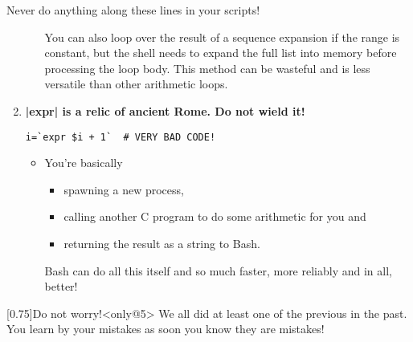 \begin{frame}[fragile]{Never do anything along these lines in your scripts!}
\begin{enumerate}
\begin{itemize}
                      You can also loop over the result of a sequence expansion if the range is constant, but the shell needs to expand the full list into memory before processing the loop body.
                      This method can be wasteful and is less versatile than other arithmetic loops.
            \end{itemize}
        \item<only@5>
            \alert{\large\textbf{\bash|expr| is a relic of ancient Rome. Do not wield it!}}
            \begin{lstlisting}[style=MyBash, numbers=none, aboveskip=3mm, belowskip=-6mm, xrightmargin=48mm]
                i=`expr $i + 1`  # VERY BAD CODE!
            \end{lstlisting}
            \begin{itemize}
                \item You're basically
                      \begin{itemize}
                          \item spawning a new process,
                          \item calling another C program to do some arithmetic for you and
                          \item returning the result as a string to Bash.
                      \end{itemize}
                      Bash can do all this itself and so much faster, more reliably and in all, better!
            \end{itemize}
            \medskip
    \end{enumerate}
    \begin{varblock}{}[0.75\textwidth]{Do not worry!}<only@5>
        We all did at least one of the previous in the past.\\
        You learn by your mistakes as soon you know they are mistakes!
    \end{varblock}
\end{frame}
